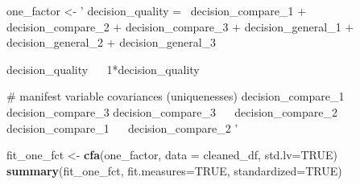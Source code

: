 \documentclass[]{article}
\newenvironment{Shaded}{\begin{snugshade}}{\end{snugshade}}
\newcommand{\DataTypeTok}[1]{\textcolor[rgb]{0.13,0.29,0.53}{#1}}
\newcommand{\KeywordTok}[1]{\textcolor[rgb]{0.13,0.29,0.53}{\textbf{#1}}}
\newcommand{\NormalTok}[1]{#1}
\newcommand{\OtherTok}[1]{\textcolor[rgb]{0.56,0.35,0.01}{#1}}
\newcommand{\StringTok}[1]{\textcolor[rgb]{0.31,0.60,0.02}{#1}}
\begin{document}
\begin{Shaded}
\begin{Highlighting}[]
\NormalTok{one_factor <-}\StringTok{ '}
\StringTok{decision_quality =~ decision_compare_1 + }
\StringTok{                    decision_compare_2 + }
\StringTok{                    decision_compare_3 +}
\StringTok{                    decision_general_1 + }
\StringTok{                    decision_general_2 + }
\StringTok{                    decision_general_3}

\StringTok{decision_quality ~~ 1*decision_quality}

\StringTok{# manifest variable covariances (uniquenesses)}
\StringTok{  decision_compare_1 ~~ decision_compare_3}
\StringTok{  decision_compare_3 ~~ decision_compare_2}
\StringTok{  decision_compare_1 ~~ decision_compare_2}
\StringTok{'}

\NormalTok{fit_one_fct <-}\StringTok{ }\KeywordTok{cfa}\NormalTok{(one_factor, }\DataTypeTok{data =}\NormalTok{ cleaned_df, }\DataTypeTok{std.lv=}\OtherTok{TRUE}\NormalTok{)}
\KeywordTok{summary}\NormalTok{(fit_one_fct, }\DataTypeTok{fit.measures=}\OtherTok{TRUE}\NormalTok{, }\DataTypeTok{standardized=}\OtherTok{TRUE}\NormalTok{)}
\end{Highlighting}
\end{Shaded}
\end{document}
